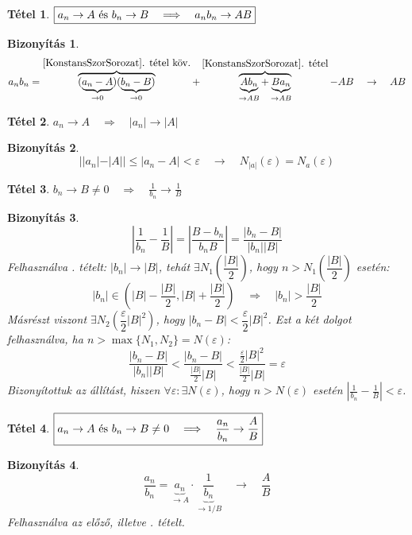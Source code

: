\documentclass[a4paper,12pt,twoside]{book}
\newtheorem{tetel}{Tétel}[chapter]
\theoremstyle{break}
\newtheorem{biz}{Bizonyítás}[chapter]
\theoremstyle{plain}
\begin{document}
\begin{tetel}\label{SzorzatLimesz}$\boxed{a_n \to A $ és $b_n \to B \quad \Longrightarrow \quad a_nb_n \to AB}$\end{tetel}
\begin{biz}
\[a_nb_n = \overbrace{(\underbrace{a_n-A}_{\to 0})(\underbrace{b_n-B}_{\to 0})}^{\hbox{\ref{KonstansSzorSorozat}. tétel köv.}}+\overbrace{\underbrace{Ab_n}_{\to AB}+\underbrace{Ba_n}_{\to AB}}^{\hbox{\ref{KonstansSzorSorozat}. tétel}}-AB \quad \to \quad AB\]

\end{biz}

\begin{tetel}\label{AbszolutertekLimesz}$\boxed{a_n\to A \quad \Longrightarrow \quad |a_n|\to |A|}$\end{tetel}
\begin{biz}
\[||a_n|-|A|| \leqslant |a_n-A| < \varepsilon \quad \rightarrow \quad N_{|a|}(\varepsilon)=N_{a}(\varepsilon)\]
\end{biz}

\begin{tetel}$\boxed{b_n \to B\neq 0 \quad \Longrightarrow \quad \frac{1}{b_n} \to \frac{1}{B}}$\end{tetel}
\begin{biz}
\[\left|\frac{1}{b_n}-\frac{1}{B}\right| = \left|\frac{B-b_n}{b_nB}\right| = \frac{|b_n-B|}{|b_n||B|}\]
Felhasználva . tételt: $|b_n|\to |B|$, tehát $\exists N_1\left(\dfrac{|B|}{2}\right)$, hogy $n>N_1\left(\dfrac{|B|}{2}\right)$ esetén:
\[|b_n| \in \left(|B|-\frac{|B|}{2}, |B|+\frac{|B|}{2}\right) \quad \Longrightarrow \quad |b_n| > \frac{|B|}{2}\]
Másrészt viszont $\exists N_2\left(\dfrac{\varepsilon}{2}|B|^2\right)$, hogy $|b_n - B| < \dfrac{\varepsilon}{2}|B|^2$. Ezt a két dolgot felhasználva, ha $n>\max\{N_1, N_2\}=N(\varepsilon)$:
\[\frac{|b_n-B|}{|b_n||B|} < \frac{|b_n-B|}{\frac{|B|}{2}|B|} < \frac{\frac{\varepsilon}{2}|B|^2}{\frac{|B|}{2}|B|} = \varepsilon \]
Bizonyítottuk az állítást, hiszen $\forall \varepsilon: \exists N(\varepsilon)$, hogy $n>N(\varepsilon)$ esetén $\left|\frac{1}{b_n}-\frac{1}{B}\right| < \varepsilon$.
\end{biz}

\begin{tetel}$\boxed{a_n \to A $ és $b_n\to B\neq 0 \quad \Longrightarrow \quad \dfrac{a_n}{b_n} \to \dfrac{A}{B}}$\end{tetel}
\begin{biz}
\[\frac{a_n}{b_n} = \underbrace{a_n}_{\to A}\cdot\underbrace{\frac{1}{b_n}}_{\to 1/B} \quad \to \quad \frac{A}{B}\]
Felhasználva az előző, illetve . tételt.
\end{biz}
\end{document}
